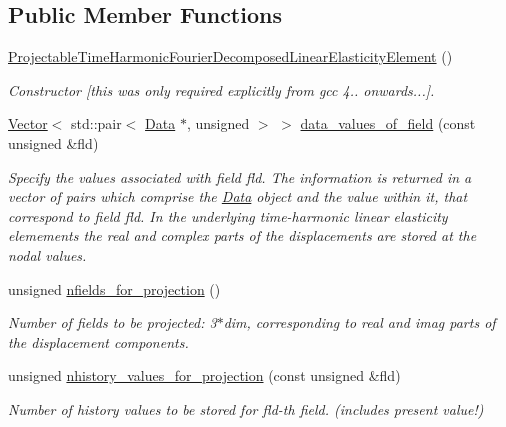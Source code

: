 \subsection*{Public Member Functions}
\begin{DoxyCompactItemize}
\item 
\hyperlink{classoomph_1_1ProjectableTimeHarmonicFourierDecomposedLinearElasticityElement_afd1c2909e2576ba90dddb2b86b22dd99}{Projectable\+Time\+Harmonic\+Fourier\+Decomposed\+Linear\+Elasticity\+Element} ()
\begin{DoxyCompactList}\small\item\em Constructor \mbox{[}this was only required explicitly from gcc 4.. onwards...\mbox{]}. \end{DoxyCompactList}\item 
\hyperlink{classoomph_1_1Vector}{Vector}$<$ std\+::pair$<$ \hyperlink{classoomph_1_1Data}{Data} $\ast$, unsigned $>$ $>$ \hyperlink{classoomph_1_1ProjectableTimeHarmonicFourierDecomposedLinearElasticityElement_a4fcccf713843eda6d6cab9c73950d0d1}{data\+\_\+values\+\_\+of\+\_\+field} (const unsigned \&fld)
\begin{DoxyCompactList}\small\item\em Specify the values associated with field fld. The information is returned in a vector of pairs which comprise the \hyperlink{classoomph_1_1Data}{Data} object and the value within it, that correspond to field fld. In the underlying time-\/harmonic linear elasticity elemements the real and complex parts of the displacements are stored at the nodal values. \end{DoxyCompactList}\item 
unsigned \hyperlink{classoomph_1_1ProjectableTimeHarmonicFourierDecomposedLinearElasticityElement_aee73e1027994f0c4908d048a930c3992}{nfields\+\_\+for\+\_\+projection} ()
\begin{DoxyCompactList}\small\item\em Number of fields to be projected\+: 3$\ast$dim, corresponding to real and imag parts of the displacement components. \end{DoxyCompactList}\item 
unsigned \hyperlink{classoomph_1_1ProjectableTimeHarmonicFourierDecomposedLinearElasticityElement_a6ab68c3941f90a662a1b696bc7d4b3d7}{nhistory\+\_\+values\+\_\+for\+\_\+projection} (const unsigned \&fld)
\begin{DoxyCompactList}\small\item\em Number of history values to be stored for fld-\/th field. (includes present value!) \end{DoxyCompactList}\item 

\end{DoxyCompactItemize}
